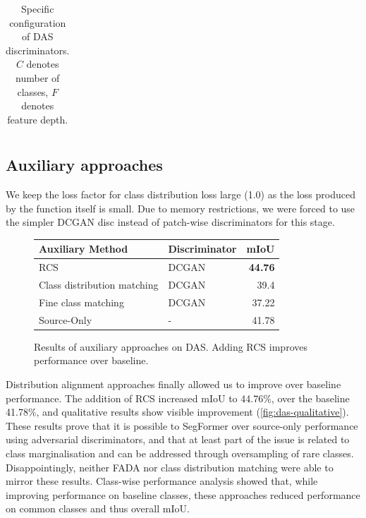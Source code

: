 \documentclass[a4paper,12pt]{report}
\begin{document}
\begin{table}[]
{\begin{tabular}{|l|l|}
        \end{tabular}
    }
    \caption{Specific configuration of DAS discriminators. $C$ denotes number of classes, $F$ denotes feature depth.}
    \label{tab:das-disc-configurations}
\end{table}

\subsection{Auxiliary approaches}
We keep the loss factor for class distribution loss large (1.0) as the loss produced by the function itself is small. Due to memory restrictions, we were forced to use the simpler DCGAN disc instead of patch-wise discriminators for this stage.

\begin{figure}[h]
    \centering
    \begin{tabular}{|l|l|r|}
        \hline
        Auxiliary Method            & Discriminator & \multicolumn{1}{l|}{mIoU} \\ \hline
        RCS                         & DCGAN         & \textbf{44.76}            \\ \hline
        Class distribution matching & DCGAN         & 39.4                      \\ \hline
        Fine class matching         & DCGAN         & 37.22                     \\ \hline
        Source-Only                 & -             & 41.78                     \\ \hline
    \end{tabular}
    \caption{Results of auxiliary approaches on DAS. Adding RCS improves performance over baseline.}
\end{figure}

Distribution alignment approaches finally allowed us to improve over baseline performance. The addition of RCS increased mIoU to 44.76\%, over the baseline 41.78\%, and qualitative results show visible improvement (\autoref{fig:das-qualitative}). These results prove that it is possible to SegFormer over source-only performance using adversarial discriminators, and that at least part of the issue is related to class marginalisation and can be addressed through oversampling of rare classes. Disappointingly, neither FADA nor class distribution matching were able to mirror these results. Class-wise performance analysis showed that, while improving performance on baseline classes, these approaches reduced performance on common classes and thus overall mIoU.
\end{document}
